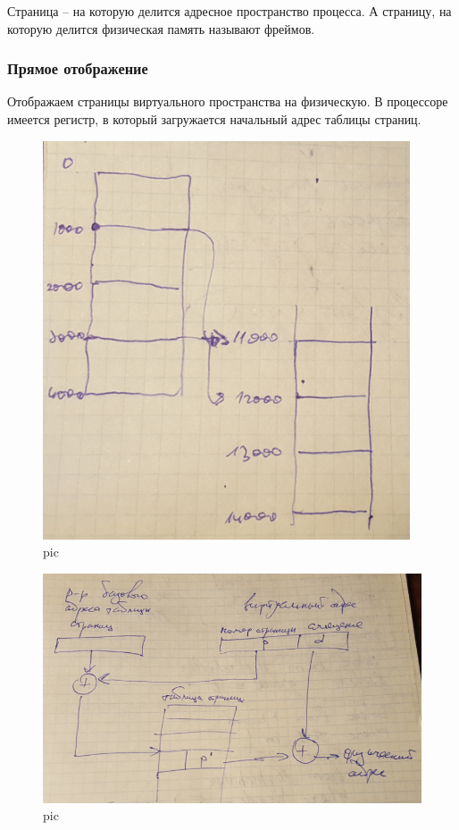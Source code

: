 Страница – на которую делится адресное пространство процесса. А страницу, на которую делится физическая память называют фреймов.

\subsubsection{Прямое отображение}
Отображаем страницы виртуального пространства на физическую. В процессоре имеется регистр, в который загружается начальный адрес таблицы страниц.

\begin{figure}[H]
    \centering
    \includegraphics[width=\textwidth]{pic/4.png}
    \caption{pic}
\end{figure}

\begin{figure}[H]
    \centering
    \includegraphics[width=\textwidth]{pic/5.png}
    \caption{pic}
\end{figure}

